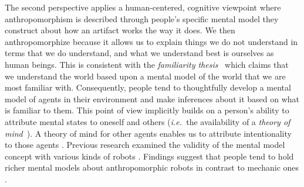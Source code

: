 \documentclass{sig-alternate-2013}
\newcommand{\ie}{{\textit{i.e.~}}}
\begin{document}
The second perspective applies a human-centered, cognitive viewpoint where
anthropomorphism is described through people's specific mental model they
construct about how an artifact works the way it does.  We then anthropomorphize
because it allows us to explain things we do not understand in terms that we do
understand, and what we understand best is ourselves as human beings. This is
consistent with the \emph{familiarity thesis}~\cite{hegel_understanding_2008}
which claims that we understand the world based upon a mental model of the world
that we are most familiar with. Consequently, people tend to thoughtfully
develop a mental model of agents in their environment and make inferences about
it based on what is familiar to them. This point of view implicitly builds on a
person's ability to attribute mental states to oneself and others (\ie the
availability of a \emph{theory of mind}~\cite{premack1978does}). A theory of
mind for other agents enables us to attribute intentionality to those agents
\cite{leslie_pretense_1987,admoni_multi-category_2012}. Previous research
examined the validity of the mental model concept with various kinds of robots
\cite{schmitz_concepts_2011,kiesler_mental_2002}. Findings suggest that people
tend to hold richer mental models about anthropomorphic robots in contrast to
mechanic ones \cite{kiesler_mental_2002}.
\end{document}
